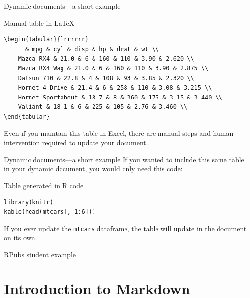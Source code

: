 \documentclass{beamer}
\begin{document}
\begin{frame}[fragile]{Dynamic documents---a short example}
    \begin{exampleblock}{Manual table in LaTeX}
    \begin{lstlisting}
\begin{tabular}{lrrrrrr}
      & mpg & cyl & disp & hp & drat & wt \\
    Mazda RX4 & 21.0 & 6 & 160 & 110 & 3.90 & 2.620 \\
    Mazda RX4 Wag & 21.0 & 6 & 160 & 110 & 3.90 & 2.875 \\
    Datsun 710 & 22.8 & 4 & 108 & 93 & 3.85 & 2.320 \\
    Hornet 4 Drive & 21.4 & 6 & 258 & 110 & 3.08 & 3.215 \\
    Hornet Sportabout & 18.7 & 8 & 360 & 175 & 3.15 & 3.440 \\
    Valiant & 18.1 & 6 & 225 & 105 & 2.76 & 3.460 \\
\end{tabular}
    \end{lstlisting}
    \end{exampleblock}
Even if you maintain this table in Excel, there are manual steps and human intervention required to update your document.
\end{frame}

\begin{frame}[fragile]{Dynamic documents---a short example}
If you wanted to include this same table in your dynamic document, you would only need this code:
    \begin{exampleblock}{Table generated in R code}
    \begin{lstlisting}
library(knitr)
kable(head(mtcars[, 1:6]))
    \end{lstlisting}
    \end{exampleblock}
If you ever update the \verb|mtcars| dataframe, the table will update in the document on its own.
\end{frame}

\begin{frame}[focus]
\href{http://rpubs.com/RexGalilae/weather-events}{RPubs student example}
\end{frame}

\section{Introduction to Markdown}
\end{document}

